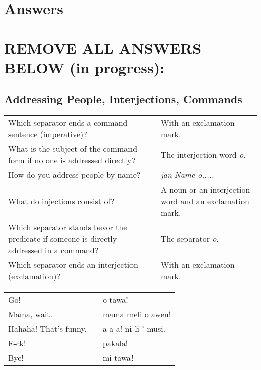 
\section{Answers}
\printsolutions

\section*{REMOVE ALL ANSWERS BELOW (in progress):}

\subsection*{Addressing People, Interjections, Commands}
\label{'commands_interjections'}

\begin{supertabular}{p{5,5cm}|ll}
    Which separator ends a command sentence (imperative)?                                      &  & With an exclamation mark.                               \\
    What is the subject of the command form if no one is addressed directly?                   &  & The interjection word \textit{o}.                       \\
    How do you address people by name?                                                         &  & \textit{jan Name o,.... }                               \\
    What do injections consist of?                                                             &  & A noun or an interjection word and an exclamation mark. \\
    Which separator stands bevor  the predicate if someone is directly addressed in a command? &  & The separator \textit{o}.                               \\
    Which separator ends an interjection (exclamation)?                                        &  & With an exclamation mark.                               \\
\end{supertabular}

\begin{supertabular}{p{5,5cm}|ll}
    Go!                   &  & o tawa!              \\
    Mama, wait.           &  & mama meli o awen!    \\
    Hahaha! That's funny. &  & a a a! ni li ' musi. \\
    F-ck!                 &  & pakala!              \\
    Bye!                  &  & mi tawa!             \\
\end{supertabular}

